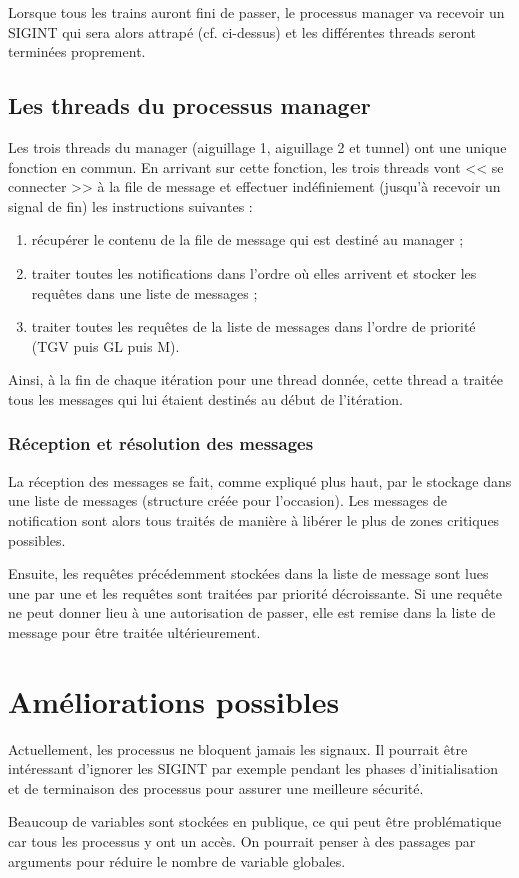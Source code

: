\documentclass[a4paper,12pt]{article}
\begin{document}
Lorsque tous les trains auront fini de passer, le processus manager va recevoir un SIGINT qui sera alors attrapé (cf. ci-dessus) et les différentes threads seront terminées proprement.

\subsection{Les threads du processus manager}

Les trois threads du manager (aiguillage 1, aiguillage 2 et tunnel) ont une unique fonction en commun. En arrivant sur cette fonction, les trois threads vont << se connecter >> à la file de message et effectuer indéfiniement (jusqu'à recevoir un signal de fin) les instructions suivantes :

\begin{enumerate}
    \item récupérer le contenu de la file de message qui est destiné au manager ;
    \item traiter toutes les notifications dans l'ordre où elles arrivent et stocker les requêtes dans une liste de messages ;
    \item traiter toutes les requêtes de la liste de messages dans l'ordre de priorité (TGV puis GL puis M).
\end{enumerate}

Ainsi, à la fin de chaque itération pour une thread donnée, cette thread a traitée tous les messages qui lui étaient destinés au début de l'itération.

\subsubsection{Réception et résolution des messages}

La réception des messages se fait, comme expliqué plus haut, par le stockage dans une liste de messages (structure créée pour l'occasion). Les messages de notification sont alors tous traités de manière à libérer le plus de zones critiques possibles.

Ensuite, les requêtes précédemment stockées dans la liste de message sont lues une par une et les requêtes sont traitées par priorité décroissante. Si une requête ne peut donner lieu à une autorisation de passer, elle est remise dans la liste de message pour être traitée ultérieurement.

\section{Améliorations possibles}

Actuellement, les processus ne bloquent jamais les signaux. Il pourrait être intéressant d'ignorer les SIGINT par exemple pendant les phases d'initialisation et de terminaison des processus pour assurer une meilleure sécurité.

Beaucoup de variables sont stockées en publique, ce qui peut être problématique car tous les processus y ont un accès. On pourrait penser à des passages par arguments pour réduire le nombre de variable globales.
\end{document}
